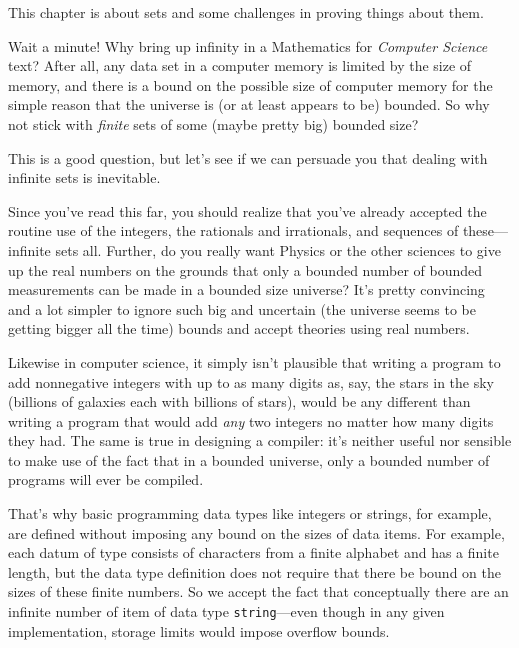 
This chapter is about  sets and some challenges in proving
things about them.

Wait a minute!  Why bring up infinity in a Mathematics for \emph{Computer
  Science} text?  \iffalse We've run into a lot of computer science
students who wonder why they should care about infinite sets.  They point
out that \fi
%
After all, any data set in a computer memory is limited by the size of
memory, and there is a bound on the possible size of computer memory for
the simple reason that the universe is (or at least appears to be)
bounded.  So why not stick with \emph{finite} sets of some (maybe pretty
big) bounded size?
%
\iffalse need to learn all this abstract theory of infinite sets, and this
is a good question.  \fi
%
This is a good question, but let's see if we can persuade you that dealing
with infinite sets is inevitable.

Since you've read this far, you should realize that you've already
accepted the routine use of the integers, the rationals and irrationals,
and sequences of these---infinite sets all.  Further, do you really want
Physics or the other sciences to give up the real numbers on the grounds
that only a bounded number of bounded measurements can be made in a
bounded size universe?  It's pretty convincing and a lot simpler to ignore
such big and uncertain (the universe seems to be getting bigger all the
time) bounds and accept theories using real numbers.

Likewise in computer science, it simply isn't plausible that writing a
program to add nonnegative integers with up to as many digits as, say, the
stars in the sky (billions of galaxies each with billions of stars), would
be any different than writing a program that would add \emph{any} two
integers no matter how many digits they had.  The same is true in
designing a compiler: it's neither useful nor sensible to make use of the
fact that in a bounded universe, only a bounded number of programs will
ever be compiled.

\iffalse
That's why basic programming data types like integers or strings, for
example, are defined without imposing any bound on the sizes of data
items.  For example, each datum of type  consists of
characters from a finite alphabet and has a finite length, but the data
type definition does not require that there be bound on the sizes of these
finite numbers.  So we accept the fact that conceptually there are an
infinite number of item of data type \texttt{string}---even though in any
given implementation, storage limits would impose overflow bounds.

